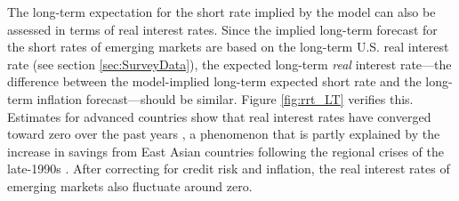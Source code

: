 {%


The long-term expectation for the short rate implied by the model can also be assessed in terms of real interest rates.
Since the implied long-term forecast for the short rates of emerging markets are based on the long-term U.S. real interest rate (see section \ref{sec:SurveyData}), the expected long-term \textit{real} interest rate---the difference between the model-implied long-term expected short rate and the long-term inflation forecast---should be similar.
Figure \ref{fig:rrt_LT} verifies this.
Estimates for advanced countries show that real interest rates have converged toward zero over the past years \citep*{HolstonLaubachWilliams:2017}, a phenomenon that is partly explained by the increase in savings from East Asian countries following the regional crises of the late-1990s \citep{Obstfeld:2020}.
After correcting for credit risk and inflation, the real interest rates of emerging markets also fluctuate around zero.

}
